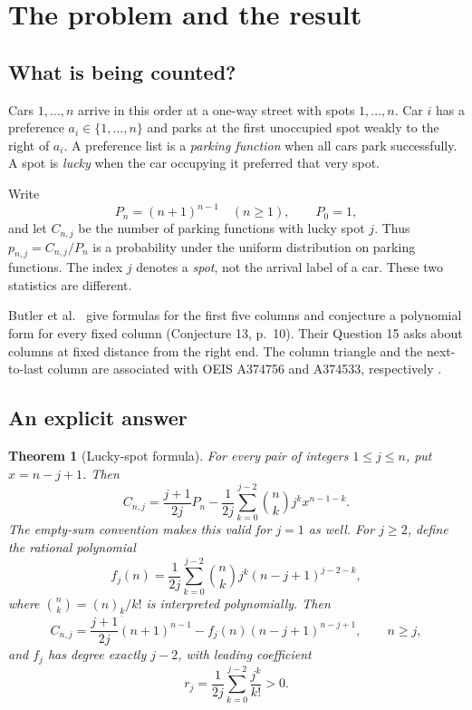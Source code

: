 \documentclass[11pt,letterpaper]{article}
\numberwithin{equation}{section}
\newtheorem{theorem}{Theorem}[section]
\theoremstyle{definition}
\newcommand{\fall}[2]{(#1)_{\underline{#2}}}
\begin{document}
\tableofcontents
\newpage

\section{The problem and the result}
\label{sec:main}

\subsection{What is being counted?}
Cars $1,\ldots,n$ arrive in this order at a one-way street with spots
$1,\ldots,n$. Car $i$ has a preference $a_i\in\{1,\ldots,n\}$ and parks at the
first unoccupied spot weakly to the right of $a_i$. A preference list is a
\emph{parking function} when all cars park successfully. A spot is
\emph{lucky} when the car occupying it preferred that very spot.

Write
\[
 P_n=(n+1)^{n-1}\quad(n\ge1),\qquad P_0=1,
\]
and let $C_{n,j}$ be the number of parking functions with lucky spot $j$.
Thus $p_{n,j}=C_{n,j}/P_n$ is a probability under the uniform distribution on
parking functions. The index $j$ denotes a \emph{spot}, not the arrival label
of a car. These two statistics are different.

Butler et al.\ \cite{butler} give formulas for the first five columns and
conjecture a polynomial form for every fixed column (Conjecture 13, p.~10).
Their Question 15 asks about columns at fixed distance from the right end.
The column triangle and the next-to-last column are associated with OEIS
A374756 and A374533, respectively \cite{oeis-triangle,oeis-next}.

\subsection{An explicit answer}
\begin{theorem}[Lucky-spot formula]\label{thm:main}
For every pair of integers $1\le j\le n$, put $x=n-j+1$. Then
\begin{equation}\label{eq:main}
 \boxed{\displaystyle
 C_{n,j}=\frac{j+1}{2j}P_n
 -\frac{1}{2j}\sum_{k=0}^{j-2}\binom nk j^k x^{n-1-k}.}
\end{equation}
The empty-sum convention makes this valid for $j=1$ as well.
For $j\ge2$, define the rational polynomial
\begin{equation}\label{eq:f}
 f_j(n)=\frac{1}{2j}\sum_{k=0}^{j-2}
           \binom nk j^k(n-j+1)^{j-2-k},
\end{equation}
where $\binom nk=\fall nk/k!$ is interpreted polynomially. Then
\begin{equation}\label{eq:conjecture}
 C_{n,j}=\frac{j+1}{2j}(n+1)^{n-1}
             -f_j(n)(n-j+1)^{n-j+1},
 \qquad n\ge j,
\end{equation}
and $f_j$ has degree exactly $j-2$, with leading coefficient
\begin{equation}\label{eq:r}
 r_j=\frac{1}{2j}\sum_{k=0}^{j-2}\frac{j^k}{k!}>0.
\end{equation}
\end{theorem}
\end{document}
